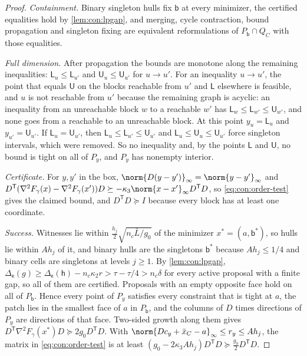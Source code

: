 \begin{proof}
\emph{Containment.} Binary singleton hulls fix $\mathsf b$ at every minimizer,
the certified equalities hold by \cref{lem:con:lpgap}, and merging, cycle
contraction, bound propagation and singleton fixing are equivalent
reformulations of $P_{\mathsf b}\cap Q_C$ with those equalities.

\emph{Full dimension.} After propagation the bounds are monotone along the
remaining inequalities: $\mathsf L_u\le\mathsf L_{u'}$ and $\mathsf U_u\le\mathsf
U_{u'}$ for $u\to u'$. For an inequality $u\to u'$, the point that equals
$\mathsf U$ on the blocks reachable from $u'$ and $\mathsf L$ elsewhere is
feasible, and $u$ is not reachable from $u'$ because the remaining graph is
acyclic: an inequality from an unreachable block $w$ to a reachable $w'$
has $\mathsf L_w\le\mathsf L_{w'}\le\mathsf U_{w'}$, and none goes from a
reachable to an unreachable block. At this point $y_u=\mathsf L_u$ and
$y_{u'}=\mathsf U_{u'}$. If $\mathsf L_u=\mathsf U_{u'}$, then
$\mathsf L_u\le\mathsf L_{u'}\le\mathsf U_{u'}$ and
$\mathsf L_u\le\mathsf U_u\le\mathsf U_{u'}$ force singleton intervals, which
were removed. So no inequality and, by the points $\mathsf L$ and $\mathsf U$,
no bound is tight on all of $P_y$, and $P_y$ has nonempty interior.

\emph{Certificate.} For $y,y'$ in the box,
$\norm{D(y-y')}_\infty=\norm{y-y'}_\infty$ and
$D^{\mathsf T}(\nabla^2F_\gamma(x)-\nabla^2F_\gamma(x'))D\succeq-\kappa_3\norm{x-x'}_\infty
D^{\mathsf T}D$, so \eqref{eq:con:order-test} gives the claimed bound, and
$D^{\mathsf T}D\succeq I$ because every block has at least one coordinate.

\emph{Success.} Witnesses lie within $\frac{h_j}2\sqrt{n_c\bar L/g_0}$ of the
minimizer $x^*=(a,\mathsf b^*)$, so hulls lie within $Ah_j$ of it, and binary
hulls are the singletons $\mathsf b^*$ because $Ah_j\le1/4$ and binary cells
are singletons at levels $j\ge1$. By \cref{lem:con:lpgap},
$\Delta_{\mathsf e}(g)\ge\Delta_{\mathsf e}(\mathsf h)-n_c\kappa_2r>\tau-\tau/4
>n_c\delta$ for every active proposal with a finite gap, so all of them are
certified. Proposals with an empty opposite face hold on all of
$P_{\mathsf b}$. Hence every point of $P_y$ satisfies every constraint that is
tight at $a$, the patch lies in the smallest face of $a$ in $P_{\mathsf b}$,
and the columns of $D$ times directions of $P_y$ are directions of that face.
Two-sided growth along them gives
$D^{\mathsf T}\nabla^2F_\gamma(x^*)D\succeq2g_0D^{\mathsf T}D$. With
$\norm{Dc_y+\bar x_C-a}_\infty\le r_y\le Ah_j$, the matrix in
\eqref{eq:con:order-test} is at least
$(g_0-2\kappa_3Ah_j)D^{\mathsf T}D\succeq\frac{g_0}2D^{\mathsf T}D$.
\end{proof}

